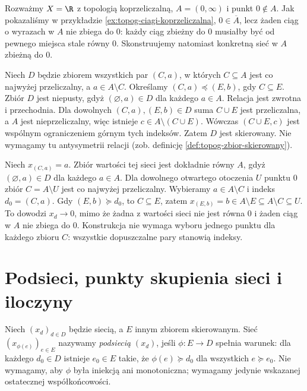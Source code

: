 \pagebreak[4]
\begin{przyklad}
\label{ex:topog-siec-koprzeliczalna-bez-ciagu}
Rozważmy $X=\R$ z topologią koprzeliczalną,
$A=(0,\infty)$ i punkt $0\notin A$.
Jak pokazaliśmy w przykładzie
\ref{ex:topog-ciagi-koprzeliczalna},
$0\in\overline A$, lecz żaden ciąg o wyrazach w $A$
nie zbiega do $0$: każdy ciąg zbieżny do $0$ musiałby
być od pewnego miejsca stale równy $0$.
Skonstruujemy natomiast konkretną sieć w $A$ zbieżną do $0$.

Niech $D$ będzie zbiorem wszystkich par $(C,a)$, w których
$C\subseteq A$ jest co najwyżej przeliczalny,
a $a\in A\setminus C$. Określamy
$(C,a)\preceq(E,b)$, gdy $C\subseteq E$.
Zbiór $D$ jest niepusty, gdyż $(\varnothing,a)\in D$
dla każdego $a\in A$. Relacja jest zwrotna i przechodnia.
Dla dowolnych $(C,a),(E,b)\in D$ suma $C\cup E$
jest przeliczalna, a $A$ jest nieprzeliczalny,
więc istnieje $c\in A\setminus(C\cup E)$.
Wówczas $(C\cup E,c)$ jest wspólnym ograniczeniem
górnym tych indeksów. Zatem $D$ jest skierowany.
Nie wymagamy tu antysymetrii relacji (zob.
definicję \ref{def:topog-zbior-skierowany}).

Niech $x_{(C,a)}=a$. Zbiór wartości tej sieci jest
dokładnie równy $A$, gdyż $(\varnothing,a)\in D$ dla
każdego $a\in A$. Dla dowolnego otwartego otoczenia
$U$ punktu $0$ zbiór $C=A\setminus U$ jest co najwyżej
przeliczalny. Wybieramy $a\in A\setminus C$
i indeks $d_0=(C,a)$. Gdy $(E,b)\succeq d_0$,
to $C\subseteq E$, zatem
$x_{(E,b)}=b\in A\setminus E\subseteq A\setminus C\subseteq U$.
To dowodzi $x_d\to0$, mimo że żadna z wartości sieci
nie jest równa $0$ i żaden ciąg w $A$ nie zbiega do $0$.
Konstrukcja nie wymaga wyboru jednego punktu dla każdego
zbioru $C$: wszystkie dopuszczalne pary stanowią indeksy.
\end{przyklad}

\section{Podsieci, punkty skupienia sieci i iloczyny}
\label{sec:topog-podsieci}

\begin{definicja}[Podsieć]
\label{def:topog-podsiec}
Niech $(x_d)_{d\in D}$ będzie siecią, a $E$ innym
zbiorem skierowanym. Sieć $(x_{\phi(e)})_{e\in E}$
nazywamy \emph{podsiecią} $(x_d)$, jeśli
$\phi\colon E\to D$ spełnia warunek:
dla każdego $d_0\in D$ istnieje $e_0\in E$ takie,
że $\phi(e)\succeq d_0$ dla wszystkich $e\succeq e_0$.
Nie wymagamy, aby $\phi$ była iniekcją ani
monotoniczna; wymagamy jedynie wskazanej ostatecznej
współkońcowości.
\end{definicja}

